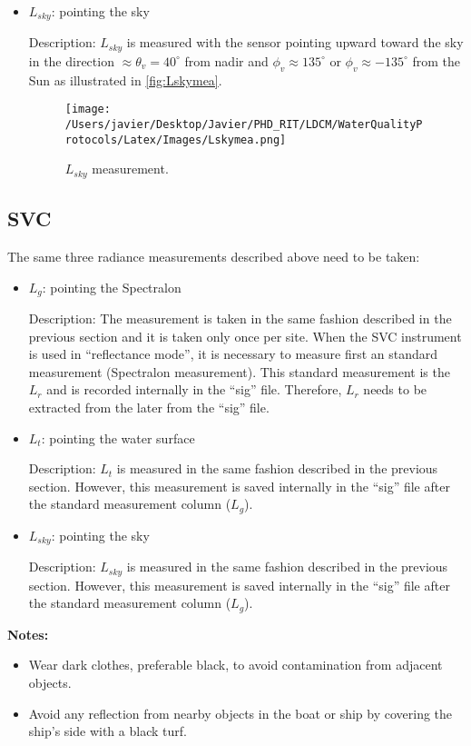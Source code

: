 \begin{appendices}
\begin{itemize}
	\item $L_{sky}$: pointing the sky

Description: $L_{sky}$ is measured with the sensor pointing upward toward the sky in the direction $\approx \theta_v = 40^\circ$ from nadir and $\phi_v \approx 135^\circ$ or $\phi_v \approx -135^\circ$ from the Sun as illustrated in \autoref{fig:Lskymea}.

\begin{figure}[htb]
\centering
    \texttt{[image: /Users/javier/Desktop/Javier/PHD\_RIT/LDCM/WaterQualityProtocols/Latex/Images/Lskymea.png]}
    \vspace{0.5cm}
   \caption[]{\label{fig:Lskymea} $L_{sky}$ measurement.}
\end{figure}

\end{itemize}

\subsection{SVC}
The same three radiance measurements described above need to be taken:

\begin{itemize}
	\item $L_g$: pointing the Spectralon

Description: The measurement is taken in the same fashion described in the previous section and it is taken only once per site. When the SVC instrument is used in ``reflectance mode'', it is necessary to measure first an standard measurement (Spectralon measurement). This standard measurement is the $L_r$ and is recorded internally in the ``sig'' file. Therefore, $L_r$ needs to be extracted from the later from the ``sig'' file. 

	\item $L_t$: pointing the water surface

Description: $L_t$ is measured in the same fashion described in the previous section. However, this measurement is saved internally in the ``sig'' file after the standard measurement column ($L_g$).

	\item $L_{sky}$: pointing the sky	

Description: $L_{sky}$ is measured in the same fashion described in the previous section. However, this measurement is saved internally in the ``sig'' file after the standard measurement column ($L_g$).

\end{itemize}
{\bf Notes:}
\begin{itemize}
	\item Wear dark clothes, preferable black, to avoid contamination from adjacent objects.
	\item Avoid any reflection from nearby objects in the boat or ship by covering the ship's side with a black turf. 
\end{itemize}




\end{appendices}
